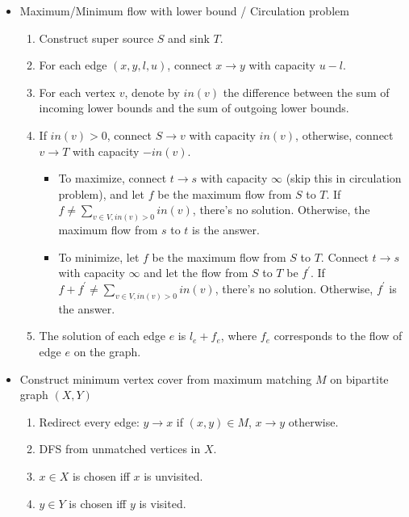 \begin{itemize}
    \item Maximum/Minimum flow with lower bound / Circulation problem
    \begin{enumerate}
        \item Construct super source $S$ and sink $T$.
        \item For each edge $(x, y, l, u)$, connect $x \rightarrow y$ with capacity $u - l$.
        \item For each vertex $v$, denote by $in(v)$ the difference between the sum of incoming lower bounds and the sum of outgoing lower bounds.
        \item If $in(v) > 0$, connect $S \rightarrow v$ with capacity $in(v)$, otherwise, connect $v \rightarrow T$ with capacity $-in(v)$.
        \begin{itemize}
            \item To maximize, connect $t \rightarrow s$ with capacity $\infty$ (skip this in circulation problem), and let $f$ be the maximum flow from $S$ to $T$. If $f \neq \sum_{v \in V, in(v) > 0}{in(v)}$, there's no solution. Otherwise, the maximum flow from $s$ to $t$ is the answer.
            \item To minimize, let $f$ be the maximum flow from $S$ to $T$. Connect $t \rightarrow s$ with capacity $\infty$ and let the flow from $S$ to $T$ be $f^\prime$. If $f + f^\prime \neq \sum_{v \in V, in(v) > 0}{in(v)}$, there's no solution. Otherwise, $f^\prime$ is the answer.
        \end{itemize}
        \item The solution of each edge $e$ is $l_e + f_e$, where $f_e$ corresponds to the flow of edge $e$ on the graph.
    \end{enumerate}
    \item Construct minimum vertex cover from maximum matching $M$ on bipartite graph $(X, Y)$
    \begin{enumerate}
        \item Redirect every edge: $y \rightarrow x$ if $(x, y) \in M$, $x \rightarrow y$ otherwise.
        \item DFS from unmatched vertices in $X$.
        \item $x \in X$ is chosen iff $x$ is unvisited.
        \item $y \in Y$ is chosen iff $y$ is visited.

\end{enumerate}
\end{itemize}
